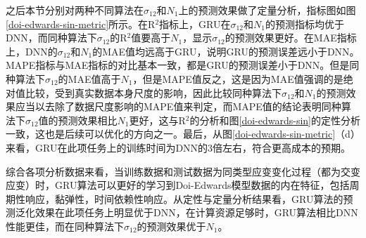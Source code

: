 之后本节分别对两种不同算法在$\sigma_{12}$和$N_1$上的预测效果做了定量分析，指标图如图\ref{doi-edwards-sin-metric}所示。在R$^2$指标上，GRU在$\sigma_{12}$和$N_1$的预测指标均优于DNN，而同种算法下$\sigma_{12}$的R$^2$值要高于$N_1$，显示$\sigma_{12}$的预测效果更好。在MAE指标上，DNN的$\sigma_{12}$和$N_1$的MAE值均远高于GRU，说明GRU的预测误差远小于DNN。MAPE指标与MAE指标的对比基本一致，都是GRU的预测误差小于DNN。但是同种算法下$\sigma_{12}$的MAE值高于$N_1$，但是MAPE值反之，这是因为MAE值强调的是绝对值比较，受到真实数据本身尺度的影响，因此比较同种算法下$\sigma_{12}$和$N_1$的预测效果应当以去除了数据尺度影响的MAPE值来判定，而MAPE值的结论表明同种算法下$\sigma_{12}$值的预测效果相比$N_1$更好，这与R$^2$的分析和图\ref{doi-edwards-sin}的定性分析一致，这也是后续可以优化的方向之一。最后，从图\ref{doi-edwards-sin-metric}（d）来看，GRU在此项任务上的训练时间为DNN的3倍左右，符合更高成本的预期。

综合各项分析数据来看，当训练数据和测试数据为同类型应变变化过程（都为交变应变）时，GRU算法可以更好的学习到Doi-Edwards模型数据的内在特征，包括周期性响应，黏弹性，时间依赖性响应。从定性与定量分析结果看，GRU算法的预测泛化效果在此项任务上明显优于DNN，在计算资源足够时，GRU算法相比DNN性能更佳，而在同种算法下$\sigma_{12}$的预测效果优于$N_1$。
